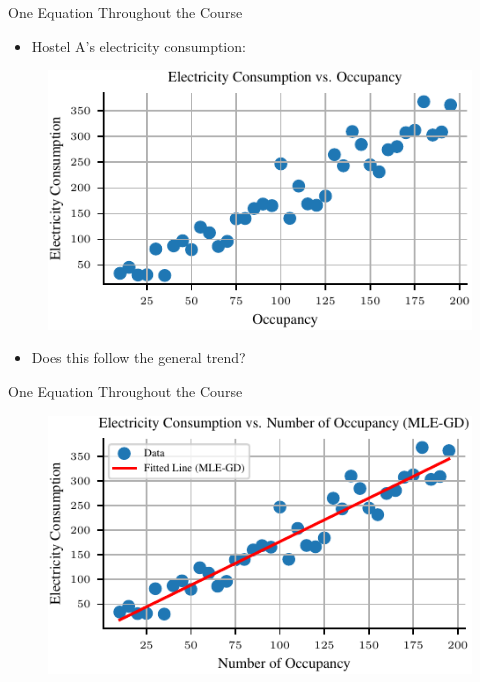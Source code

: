 \documentclass[handout]{beamer}
\begin{document}
    \begin{frame}{One Equation Throughout the Course}
        \begin{itemize}
            \item Hostel A's electricity consumption:
        \end{itemize}
        \begin{figure}
            \includegraphics{../figures/introduction-madhav/mle_good.pdf}
        \end{figure}
        \begin{itemize}
            \item Does this follow the general trend?
        \end{itemize}
    \end{frame}


    \begin{frame}{One Equation Throughout the Course}
        \begin{figure}
            \includegraphics{../figures/introduction-madhav/mle_good_fit.pdf}
        \end{figure}
        
    \end{frame}
\end{document}
